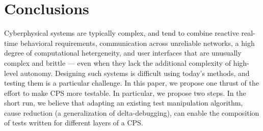 \section{Conclusions}

Cyberphysical systems are typically complex, and tend to combine reactive real-time behavioral requirements, communication across unreliable networks, a high degree of computational hetergeneity, and user interfaces that are unusually complex and brittle --- even when they lack the additional complexity of high-level autonomy.  Designing such systems is difficult using today's methods, and testing them is a particular challenge.  In this paper, we propose one thrust of the effort to make CPS more testable.  In particular, we propose two steps.  In the short run, we believe that adapting an existing test manipulation algorithm, cause reduction (a generalization of delta-debugging), can enable the composition of tests written for different layers of a CPS.   